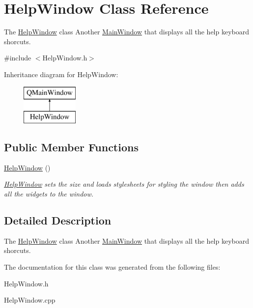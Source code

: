 \hypertarget{class_help_window}{}\section{Help\+Window Class Reference}
\label{class_help_window}


The \hyperlink{class_help_window}{Help\+Window} class Another \hyperlink{class_main_window}{Main\+Window} that displays all the help keyboard shorcuts.  




{\ttfamily \#include $<$Help\+Window.\+h$>$}

Inheritance diagram for Help\+Window\+:\begin{figure}[H]
\begin{center}
\leavevmode
\includegraphics[height=2.000000cm]{class_help_window}
\end{center}
\end{figure}
\subsection*{Public Member Functions}
\begin{DoxyCompactItemize}
\item 
\hypertarget{class_help_window_a2b7a462b4cb7876cd597efe4c52a3da7}{}\hyperlink{class_help_window_a2b7a462b4cb7876cd597efe4c52a3da7}{Help\+Window} ()\label{class_help_window_a2b7a462b4cb7876cd597efe4c52a3da7}

\begin{DoxyCompactList}\small\item\em \hyperlink{class_help_window}{Help\+Window} sets the size and loads stylesheets for styling the window then adds all the widgets to the window. \end{DoxyCompactList}\end{DoxyCompactItemize}


\subsection{Detailed Description}
The \hyperlink{class_help_window}{Help\+Window} class Another \hyperlink{class_main_window}{Main\+Window} that displays all the help keyboard shorcuts. 

The documentation for this class was generated from the following files\+:\begin{DoxyCompactItemize}
\item 
Help\+Window.\+h\item 
Help\+Window.\+cpp\end{DoxyCompactItemize}
